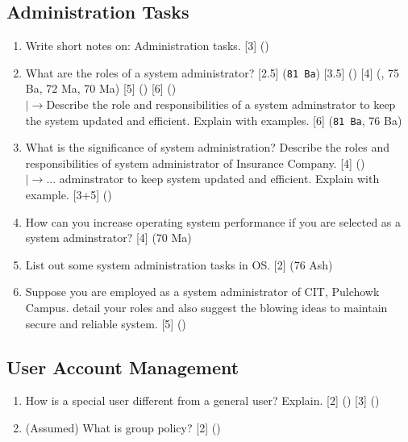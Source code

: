 \documentclass[12pt]{article}
\newcommand{\lb}{\\$\left|\rightarrow\right.$}
\begin{document}
	\subsection{Administration Tasks}
		\begin{enumerate}
			\item Write short notes on: Administration tasks. \hfill [3] ()

			\item What are the roles of a system administrator? \hfill [2.5] (\texttt{81 Ba}) [3.5] () [4] (, 75 Ba, 72 Ma, 70 Ma) [5] () [6] ()
			\lb Describe the role and responsibilities of a system adminstrator to keep the system updated and efficient. Explain with examples. \hfill [6] (\texttt{81 Ba}, 76 Ba)
			
			\item What is the significance of system administration? Describe the roles and responsibilities of system administrator of Insurance Company. \hfill  [4] ()
			\lb ... adminstrator to keep system updated and efficient. Explain with example. [3+5] ()

			\item How can you increase operating system performance if you are selected as a system adminstrator? \hfill [4] (70 Ma)

			\item List out some system administration tasks in OS. \hfill [2] (76 Ash)

			\item Suppose you are employed as a system administrator of CIT, Pulchowk Campus. detail your roles and also suggest the blowing ideas to maintain secure and reliable system. \hfill [5] ()
		\end{enumerate}

	\subsection{User Account Management}
		\begin{enumerate}
			\item How is a special user different from a general user? Explain. \hfill [2] () [3] ()

			\item (Assumed) What is group policy? \hfill [2] ()
		\end{enumerate}
\end{document}
